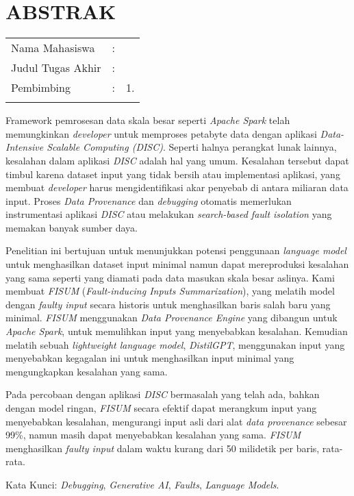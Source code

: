 \chapter*{ABSTRAK}

\vspace{2ex}

\begingroup
\setlength{\tabcolsep}{0pt}

\noindent
\begin{tabularx}{\textwidth}{l >{\centering}m{2em} X}
  Nama Mahasiswa    & : & \name{}         \\

  Judul Tugas Akhir & : & \tatitle{}      \\

  Pembimbing        & : & 1. \advisor{}   \\
  \\
\end{tabularx}
\endgroup

Framework pemrosesan data skala besar seperti \textit{Apache Spark} telah memungkinkan \textit{developer} untuk memproses petabyte data dengan aplikasi \textit{Data-Intensive Scalable Computing (DISC)}. Seperti halnya perangkat lunak lainnya, kesalahan dalam aplikasi \textit{DISC} adalah hal yang umum. Kesalahan tersebut dapat timbul karena dataset input yang tidak bersih atau implementasi aplikasi, yang membuat \textit{developer} harus mengidentifikasi akar penyebab di antara miliaran data input. Proses \textit{Data Provenance} dan \textit{debugging} otomatis memerlukan instrumentasi aplikasi \textit{DISC} atau melakukan \textit{search-based fault isolation} yang memakan banyak sumber daya.

Penelitian ini bertujuan untuk menunjukkan potensi penggunaan \textit{language model} untuk menghasilkan dataset input minimal namun dapat mereproduksi kesalahan yang sama seperti yang diamati pada data masukan skala besar aslinya. Kami membuat \textit{FISUM} (\textit{Fault-inducing Inputs Summarization}), yang melatih model dengan \textit{faulty input} secara historis untuk menghasilkan baris salah baru yang minimal. \textit{FISUM} menggunakan \textit{Data Provenance Engine} yang dibangun untuk \textit{Apache Spark}, untuk memulihkan input yang menyebabkan kesalahan. Kemudian melatih sebuah \textit{lightweight language model}, \textit{DistilGPT}, menggunakan input yang menyebabkan kegagalan ini untuk menghasilkan input minimal yang mengungkapkan kesalahan yang sama.

Pada percobaan dengan aplikasi \textit{DISC} bermasalah yang telah ada, bahkan dengan model ringan, \textit{FISUM} secara efektif dapat merangkum input yang menyebabkan kesalahan, mengurangi input asli dari alat \textit{data provenance} sebesar 99\%, namun masih dapat menyebabkan kesalahan yang sama. \textit{FISUM} menghasilkan \textit{faulty input} dalam waktu kurang dari 50 milidetik per baris, rata-rata.

Kata Kunci: \emph{Debugging}, \emph{Generative AI}, \emph{Faults}, \emph{Language Models}.
